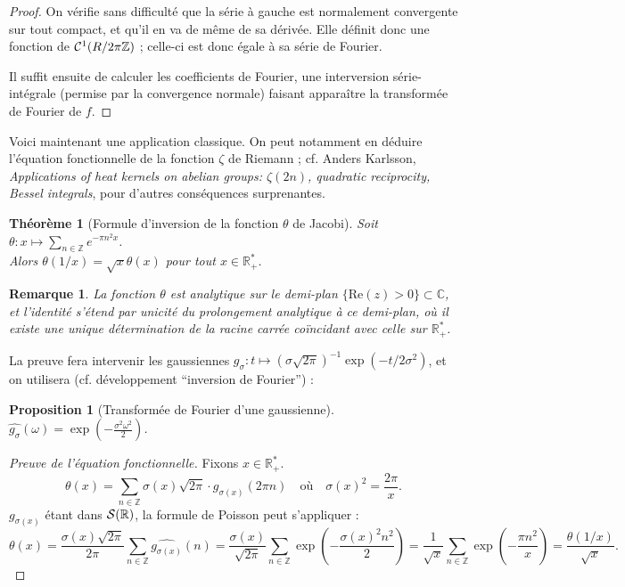 \documentclass[a4paper, 11pt]{article}
\def\Z{\mathbb{Z}}
\def\R{\mathbb{R}}
\def\C{\mathbb{C}}
\def\S{{\cal{S}}}
\def\Cf{{\cal{C}}}
\newtheorem*{proposition}{Proposition}
\newtheorem*{theorem}{Théorème}
\newtheorem*{remark}{Remarque}
\begin{document}
\begin{proof}
  On vérifie sans difficulté que la série à gauche est normalement convergente
  sur tout compact, et qu'il en va de même de sa dérivée. Elle définit donc une
  fonction de $\Cf^1(R/2\pi\Z)$ ; celle-ci est donc égale à sa série de Fourier.

  Il suffit ensuite de calculer les coefficients de Fourier, une interversion
  série-intégrale (permise par la convergence normale) faisant apparaître la
  transformée de Fourier de $f$.
\end{proof}

Voici maintenant une application classique. On peut notamment en déduire
l'équation fonctionnelle de la fonction $\zeta$ de Riemann ; cf. Anders
Karlsson, \emph{Applications of heat kernels on abelian groups: $\zeta(2n)$,
  quadratic reciprocity, Bessel integrals}, pour d'autres conséquences
surprenantes.

\begin{theorem}[Formule d'inversion de la fonction $\theta$ de Jacobi]
  Soit $\theta : x \mapsto \sum_{n \in \Z} e^{-\pi n^2 x}$.\\
  Alors $\theta(1/x) = \sqrt{x}\theta(x)$ pour tout $x \in \R_+^*$.
\end{theorem}
\begin{remark}
  La fonction $\theta$ est analytique sur le demi-plan $\{\mathrm{Re}(z) > 0\}
  \subset \C$, et l'identité s'étend par unicité du prolongement analytique à ce
  demi-plan, où il existe une unique détermination de la racine carrée
  coïncidant avec celle sur $\R^*_+$.
\end{remark}

La preuve fera intervenir les gaussiennes $g_\sigma : t \mapsto
(\sigma\sqrt{2\pi})^{-1} \exp(-t/2\sigma^2)$, et on utilisera (cf. développement
\enquote{inversion de Fourier}) :
\begin{proposition}[Transformée de Fourier d'une gaussienne]
  $\displaystyle \widehat{g_\sigma}(\omega) = \exp\left(- \frac{\sigma^2
      \omega^2}{2} \right)$. %
\end{proposition}

\begin{proof}[Preuve de l'équation fonctionnelle]
  Fixons $x \in \R_+^*$.
  \[ \theta(x) = \sum_{n \in \Z} \sigma(x)\sqrt{2\pi}
    \cdot g_{\sigma(x)}(2\pi n) \quad \text{où} \quad
    \sigma(x)^2 = \frac{2\pi}{x}.
  \]
  $g_{\sigma(x)}$ étant dans $\S(\R)$, la formule de Poisson peut s'appliquer :
  \[ \theta(x) =
    \frac{\sigma(x)\sqrt{2\pi}}{2\pi} \sum_{n \in \Z}
    \widehat{g_{\sigma(x)}}(n) =
    \frac{\sigma(x)}{\sqrt{2\pi}} \sum_{n \in \Z}
    \exp\left(-\frac{\sigma(x)^2 n^2}{2} \right) =
    \frac{1}{\sqrt{x}} \sum_{n \in \Z} \exp\left( -\frac{\pi n^2}{x} \right)
    = \frac{\theta(1/x)}{\sqrt{x}}.
  \]
\end{proof}
\end{document}
